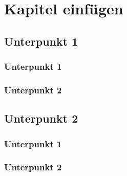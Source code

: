 %

\chapter{Kapitel einfügen}
    \section{Unterpunkt 1}
    \label{sec:unterpunkt1}

        \subsection{Unterpunkt 1}
            \blindtext                            %

        \subsection{Unterpunkt 2}
            \blindtext                            %

    \section{Unterpunkt 2}

        \subsection{Unterpunkt 1}
        \label{subsec:lalalulale}
        \blindtext                                %

        \subsection{Unterpunkt 2}
        \blindtext                                %